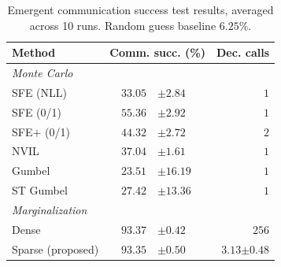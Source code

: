 \begin{table}[t]
    \begin{center}
        \begin{small}
            \begin{tabular}{lr@{~}lr}
                \toprule
                Method                                 & \multicolumn{2}{c}{Comm. succ. (\%)} & Dec. calls                             \\
                \midrule
                {\emph{Monte Carlo}}                   &                                      &                                &       \\
                SFE (NLL)                              & $33.05$                              & {\tiny\color{gray}$\pm 2.84$}  & $1$   \\
                SFE (0/1)                              & $55.36$                              & {\tiny\color{gray}$\pm 2.92$}  & $1$   \\
                SFE$+$ (0/1)                           & $44.32$                              & {\tiny\color{gray}$\pm 2.72$}  & $2$   \\
                NVIL                                   & $37.04$                              & {\tiny\color{gray}$\pm 1.61$}  & $1$   \\
                Gumbel                                 & $23.51$                              & {\tiny\color{gray}$\pm 16.19$} & $1$   \\
                ST Gumbel                              & $27.42$                              & {\tiny\color{gray}$\pm 13.36$} & $1$   \\
                \spacerule
                \emph{Marginalization}                 &                                      &                                &       \\
                Dense                                  & $93.37$                              & {\tiny\color{gray}$\pm 0.42$}  & $256$ \\
                Sparse {\small \color{gray}(proposed)} &
                $93.35$                                & {\tiny\color{gray}$\pm 0.50$}        &
                $3.13${\tiny\color{gray}$\pm 0.48$}                                                                                    \\
                \bottomrule
            \end{tabular}
        \end{small}
    \end{center}
    \caption{Emergent communication success test results,
        averaged across 10 runs. Random guess baseline $6.25\%$.}
    \label{tab:symbol}
\end{table}

